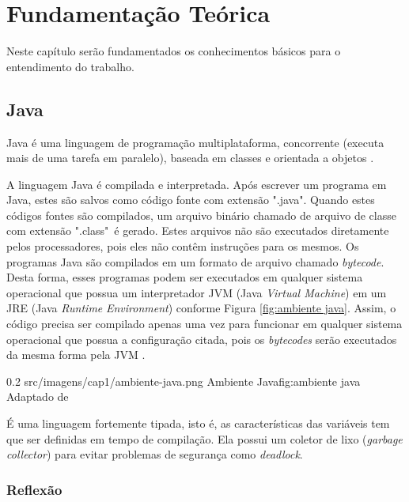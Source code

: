 \chapter{Fundamentação Teórica}
\label{ch:fundamentacao}
\par Neste capítulo ser\~ao fundamentados os conhecimentos b\'asicos para o entendimento do trabalho.

\section{Java}

\par Java é uma linguagem de programação multiplataforma, concorrente (executa mais de uma tarefa em paralelo), baseada em classes e orientada a objetos \cite{joy2000java}.
\par A linguagem Java é compilada e interpretada. Após escrever um programa em Java, estes são salvos como código fonte com extensão ".java". Quando estes códigos fontes são compilados, um arquivo binário chamado de arquivo de classe com extensão ".class"\ é gerado. Estes arquivos não são executados diretamente pelos processadores, pois eles não contêm instruções para os mesmos. Os programas Java são compilados em um formato de arquivo chamado \textit{bytecode}. Desta forma, esses programas podem ser executados em qualquer sistema operacional que possua um interpretador JVM (Java \textit{Virtual Machine}) em um JRE (Java \textit{Runtime} \textit{Environment}) conforme Figura \ref{fig:ambiente java}. Assim, o código precisa ser compilado apenas uma vez para funcionar em qualquer sistema operacional que possua a configuração citada, pois os \textit{bytecodes} serão executados da mesma forma pela JVM \cite{arnold2005java}.

\begin{image}
{0.2}
{src/imagens/cap1/ambiente-java.png}
{Ambiente Java}{fig:ambiente java}
{Adaptado de }
\end{image}

\par É uma linguagem fortemente tipada, isto é, as características das variáveis tem que ser definidas em tempo de compilação. Ela possui um coletor de lixo (\textit{garbage collector}) para evitar problemas de segurança como \textit{deadlock}. \cite{joy2000java}

\subsection{Reflexão}

